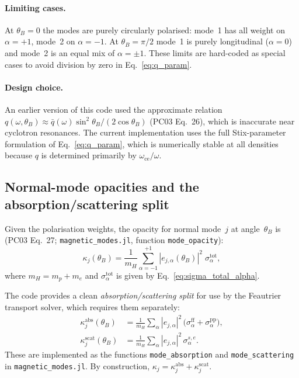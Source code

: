 \paragraph{Limiting cases.}
At $\theta_B = 0$ the modes are purely circularly polarised:
mode~1 has all weight on $\alpha=+1$, mode~2 on $\alpha=-1$.
At $\theta_B = \pi/2$ mode~1 is purely longitudinal ($\alpha=0$) and
mode~2 is an equal mix of $\alpha=\pm1$.
These limits are hard-coded as special cases to avoid division by zero
in Eq.~\eqref{eq:q_param}.

\paragraph{Design choice.}
An earlier version of this code used the approximate relation
$q(\omega,\theta_B) \approx \bar q(\omega)\sin^2\theta_B/(2\cos\theta_B)$
(PC03 Eq.~26), which is inaccurate near cyclotron resonances.
The current implementation uses the full Stix-parameter formulation
of Eq.~\eqref{eq:q_param}, which is numerically stable at all densities
because $q$ is determined primarily by $\omega_{\mathrm{ce}}/\omega$.


\subsection{Normal-mode opacities and the absorption/scattering split}
\label{sec:opacity:modes}

\noindent
Given the polarisation weights, the opacity for normal mode~$j$ at
angle~$\theta_B$ is (PC03 Eq.~27; \texttt{magnetic\_modes.jl}, function
\texttt{mode\_opacity}):
%
\begin{equation}
\label{eq:kappa_mode}
\kappa_j(\theta_B)
  = \frac{1}{m_H} \sum_{\alpha=-1}^{+1}
    |e_{j,\alpha}(\theta_B)|^2\;\sigma_\alpha^{\mathrm{tot}},
\end{equation}
%
where $m_H = m_p + m_e$ and $\sigma_\alpha^{\mathrm{tot}}$ is given by
Eq.~\eqref{eq:sigma_total_alpha}.

The code provides a clean \emph{absorption/scattering split} for use by
the Feautrier transport solver, which requires them separately:
%
\begin{align}
\kappa_j^{\mathrm{abs}}(\theta_B)
  &= \frac{1}{m_H}\sum_\alpha |e_{j,\alpha}|^2\,
     \bigl(\sigma_\alpha^{\mathrm{ff}}
     + \sigma_\alpha^{\mathrm{pp}}\bigr),
  \label{eq:mode_absorption}\\[4pt]
\kappa_j^{\mathrm{scat}}(\theta_B)
  &= \frac{1}{m_H}\sum_\alpha |e_{j,\alpha}|^2\,
     \sigma_\alpha^{s,e}.
  \label{eq:mode_scattering}
\end{align}
%
These are implemented as the functions \texttt{mode\_absorption} and
\texttt{mode\_scattering} in \texttt{magnetic\_modes.jl}.
By construction,
$\kappa_j = \kappa_j^{\mathrm{abs}} + \kappa_j^{\mathrm{scat}}$.

